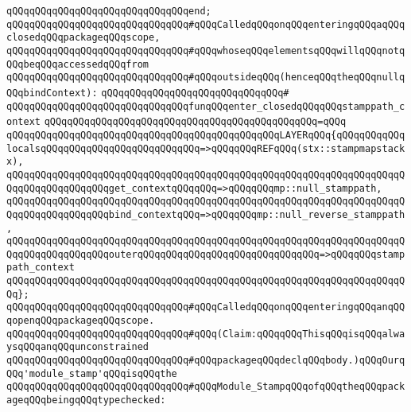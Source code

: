 \verb|qQQqqQQqqQQqqQQqqQQqqQQqqQQqqQQqend;|\newline
\newline
\newline
\verb|qQQqqQQqqQQqqQQqqQQqqQQqqQQqqQQq#qQQqCalledqQQqonqQQqenteringqQQqaqQQqclosedqQQqpackageqQQqscope,|\newline
\verb|qQQqqQQqqQQqqQQqqQQqqQQqqQQqqQQq#qQQqwhoseqQQqelementsqQQqwillqQQqnotqQQqbeqQQqaccessedqQQqfrom|\newline
\verb|qQQqqQQqqQQqqQQqqQQqqQQqqQQqqQQq#qQQqoutsideqQQq(henceqQQqtheqQQqnullqQQqbindContext):|\newline
\verb|qQQqqQQqqQQqqQQqqQQqqQQqqQQqqQQq#|\newline
\verb|qQQqqQQqqQQqqQQqqQQqqQQqqQQqqQQqfunqQQqenter_closedqQQqqQQqstamppath_context|\newline
\verb|qQQqqQQqqQQqqQQqqQQqqQQqqQQqqQQqqQQqqQQqqQQqqQQq=qQQq|\newline
\verb|qQQqqQQqqQQqqQQqqQQqqQQqqQQqqQQqqQQqqQQqqQQqqQQqLAYERqQQq{qQQqqQQqqQQqlocalsqQQqqQQqqQQqqQQqqQQqqQQqqQQq=>qQQqqQQqREFqQQq(stx::stampmapstackx),|\newline
\verb|qQQqqQQqqQQqqQQqqQQqqQQqqQQqqQQqqQQqqQQqqQQqqQQqqQQqqQQqqQQqqQQqqQQqqQQqqQQqqQQqqQQqqQQqget_contextqQQqqQQq=>qQQqqQQqmp::null_stamppath,|\newline
\verb|qQQqqQQqqQQqqQQqqQQqqQQqqQQqqQQqqQQqqQQqqQQqqQQqqQQqqQQqqQQqqQQqqQQqqQQqqQQqqQQqqQQqqQQqbind_contextqQQq=>qQQqqQQqmp::null_reverse_stamppath,|\newline
\verb|qQQqqQQqqQQqqQQqqQQqqQQqqQQqqQQqqQQqqQQqqQQqqQQqqQQqqQQqqQQqqQQqqQQqqQQqqQQqqQQqqQQqqQQqouterqQQqqQQqqQQqqQQqqQQqqQQqqQQqqQQq=>qQQqqQQqstamppath_context|\newline
\verb|qQQqqQQqqQQqqQQqqQQqqQQqqQQqqQQqqQQqqQQqqQQqqQQqqQQqqQQqqQQqqQQqqQQqqQQq};|\newline
\newline
\newline
\verb|qQQqqQQqqQQqqQQqqQQqqQQqqQQqqQQq#qQQqCalledqQQqonqQQqenteringqQQqanqQQqopenqQQqpackageqQQqscope.|\newline
\verb|qQQqqQQqqQQqqQQqqQQqqQQqqQQqqQQq#qQQq(Claim:qQQqqQQqThisqQQqisqQQqalwaysqQQqanqQQqunconstrained|\newline
\verb|qQQqqQQqqQQqqQQqqQQqqQQqqQQqqQQq#qQQqpackageqQQqdeclqQQqbody.)qQQqOurqQQq'module_stamp'qQQqisqQQqthe|\newline
\verb|qQQqqQQqqQQqqQQqqQQqqQQqqQQqqQQq#qQQqModule_StampqQQqofqQQqtheqQQqpackageqQQqbeingqQQqtypechecked:|\newline
